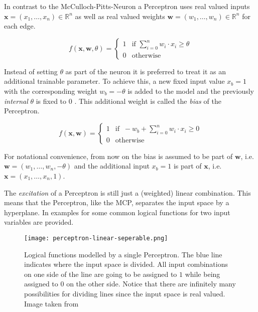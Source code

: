 In contrast to the McCulloch-Pitts-Neuron a Perceptron uses real valued inputs $\bm{x} = (x_1, \dots, x_n) \in \mathbb{R}^n$ as well as real valued weights $\bm{w} = (w_1, \dots, w_n) \in \mathbb{R}^n$ for each edge.

\begin{equation}
    f(\bm{x}, \bm{w}, \theta) =
    \begin{cases}
        1 & \text{if } \sum_{i=0}^n w_i \cdot x_i \geq \theta \\
        0 & \text{otherwise}
    \end{cases}
\end{equation}

Instead of setting $\theta$ as part of the neuron it is preferred to treat it as an additional trainable parameter.
To achieve this, a new fixed input value $x_b = 1$ with the corresponding weight $w_b = -\theta$ is added to the model and the previously \emph{internal} $\theta$ is fixed to $0$ .
This additional weight is called the \textit{bias} of the Perceptron.

\begin{equation}
    \label{eq:full-perceptron}
    f(\bm{x}, \bm{w}) =
    \begin{cases}
        1 & \text{if } ~ -w_b + \sum_{i=0}^n w_i \cdot x_i \geq 0 \\
        0 & \text{otherwise}
    \end{cases}
\end{equation}

For notational convenience, from now on the bias is assumed to be part of $\bm{w}$, i.e. $\bm{w} = (w_1, \dots, w_n, -\theta)$ and the additional input $x_b = 1$ is part of $\bm{x}$, i.e. $\bm{x} = (x_1, \dots, x_n, 1)$.

The \textit{excitation} of a Perceptron is still just a (weighted) linear combination.
This means that the Perceptron, like the MCP, separates the input space by a hyperplane.
In  examples for some common logical functions for two input variables are provided.

\begin{figure}[htb!]
    \texttt{[image: perceptron-linear-seperable.png]}
    \caption{Logical functions modelled by a single Perceptron. The blue line indicates where the input space is divided. All input combinations on one side of the line are going to be assigned to $1$ while being assigned to $0$ on the other side. Notice that there are infinitely many possibilities for dividing lines since the input space is real valued. Image taken from \cite{rudolph_lecture_2018}}
    \label{fig:perceptron-logic}
\end{figure}

